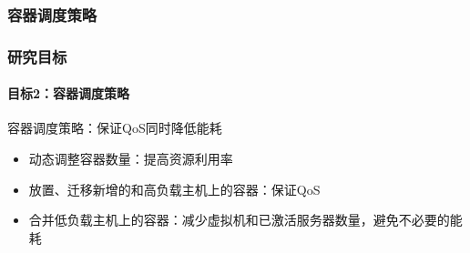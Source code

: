 \subsubsection{容器调度策略}

\begin{frame}
\frametitle{研究目标}
\framesubtitle{目标2：容器调度策略}
\begin{block}{容器调度策略：保证QoS同时降低能耗}
\begin{itemize}
    \item 动态调整容器数量：提高资源利用率
    \item 放置、迁移新增的和高负载主机上的容器：保证QoS
    \item 合并低负载主机上的容器：减少虚拟机和已激活服务器数量，避免不必要的能耗
\end{itemize}
\end{block}
\end{frame}